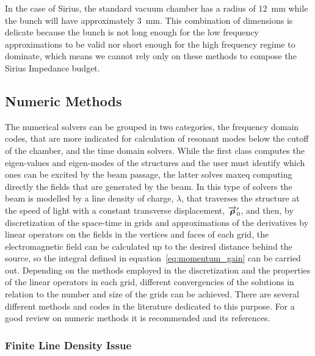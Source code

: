     In the case of Sirius, the standard vacuum chamber has a radius of \SI{12}{\milli\meter} while the bunch will have approximately \SI{3}{\milli\meter}. This combination of dimensions is delicate because the bunch is not long enough for the low frequency approximations to be valid nor short enough for the high frequency regime to dominate, which means we cannot rely only on these methods to compose the Sirius Impedance budget.

\subsection{Numeric Methods}\label{ssec:numeric_methods}

    The numerical solvers can be grouped in two categories, the frequency domain codes, that are more indicated for calculation of resonant modes below the cutoff of the chamber, and the time domain solvers. While the first class computes the eigen-values and eigen-modes of the structures and the user must identify which ones can be excited by the beam passage, the latter solves \gls{maxeq} computing directly the fields that are generated by the beam. In this type of solvers the beam is modelled by a line density of charge, $\lambda$, that traverses the structure at the speed of light with a constant transverse displacement, $\overrightarrow{\boldsymbol{\rho}}'_0$, and then, by discretization of the space-time in grids and approximations of the derivatives by linear operators on the fields in the vertices and faces of each grid, the electromagnetic field can be calculated up to the desired distance behind the source, so the integral defined in equation~\eqref{eq:momentum_gain} can be carried out. Depending on the methods employed in the discretization and the properties of the linear operators in each grid, different convergencies of the solutions in relation to the number and size of the grids can be achieved. There are several different methods and codes in the literature dedicated to this purpose. For a good review on numeric methods it is recommended  and its references.

\subsubsection{Finite Line Density Issue}

